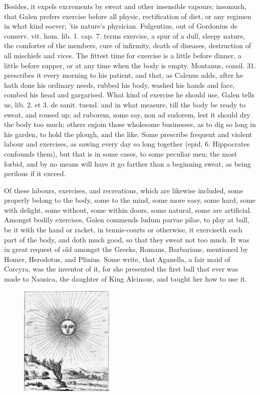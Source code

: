 {Besides, it expels excrements by sweat and other insensible vapours;
insomuch, that Galen prefers exercise before all physic,
rectification of diet, or any regimen in what kind soever; 'tis
nature's physician. Fulgentius, out of Gordonius de conserv. vit.
hom. lib. 1. cap. 7. terms exercise, a spur of a dull, sleepy nature,
the comforter of the members, cure of infirmity, death of diseases,
destruction of all mischiefs and vices. The fittest time for exercise
is a little before dinner, a little before supper, or at any time
when the body is empty. Montanus, consil. 31. prescribes it every
morning to his patient, and that, as Calenus adds, after he hath
done his ordinary needs, rubbed his body, washed his hands and face,
combed his head and gargarised. What kind of exercise he should use,
Galen tells us, lib. 2. et 3. de sanit. tuend. and in what measure,
 till the body be ready to sweat, and roused up; ad ruborem, some
say, non ad sudorem, lest it should dry the body too much; others
enjoin those wholesome businesses, as to dig so long in his garden, to
hold the plough, and the like. Some prescribe frequent and violent
labour and exercises, as sawing every day so long together (epid. 6.
Hippocrates confounds them), but that is in some cases, to some
peculiar men; the most forbid, and by no means will have it go
farther than a beginning sweat, as being perilous if it exceed.

Of these labours, exercises, and recreations, which are likewise
included, some properly belong to the body, some to the mind, some more
easy, some hard, some with delight, some without, some within doors,
some natural, some are artificial. Amongst bodily exercises, Galen
commends ludum parvae pilae, to play at ball, be it with the hand or
racket, in tennis-courts or otherwise, it exerciseth each part of the
body, and doth much good, so that they sweat not too much. It was in
great request of old amongst the Greeks, Romans, Barbarians, mentioned
by Homer, Herodotus, and Plinius. Some write, that Aganella, a fair
maid of Corcyra, was the inventor of it, for she presented the first
ball that ever was made to Nausica, the daughter of King Alcinous, and
taught her how to use it.

\begin{figure}[H]
  \begingroup
  \centering
  \includegraphics[keepaspectratio,width=0.4\textwidth]{figures/Bright-sun-Albert-Flamen-small.jpg}
  \label{fig:brightsun}
\end{figure}

}
